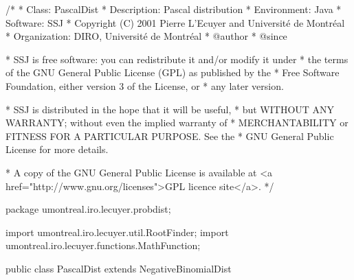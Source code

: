 \begin{code}
\begin{hide}
/*
 * Class:        PascalDist
 * Description:  Pascal distribution
 * Environment:  Java
 * Software:     SSJ 
 * Copyright (C) 2001  Pierre L'Ecuyer and Université de Montréal
 * Organization: DIRO, Université de Montréal
 * @author       
 * @since

 * SSJ is free software: you can redistribute it and/or modify it under
 * the terms of the GNU General Public License (GPL) as published by the
 * Free Software Foundation, either version 3 of the License, or
 * any later version.

 * SSJ is distributed in the hope that it will be useful,
 * but WITHOUT ANY WARRANTY; without even the implied warranty of
 * MERCHANTABILITY or FITNESS FOR A PARTICULAR PURPOSE.  See the
 * GNU General Public License for more details.

 * A copy of the GNU General Public License is available at
   <a href="http://www.gnu.org/licenses">GPL licence site</a>.
 */
\end{hide}
package umontreal.iro.lecuyer.probdist;
\begin{hide}
import umontreal.iro.lecuyer.util.RootFinder;
import umontreal.iro.lecuyer.functions.MathFunction;
\end{hide}

public class PascalDist extends NegativeBinomialDist\begin{hide} {
   private static final double EPSI = 1.0E-10;

   private static class Function implements MathFunction {
      protected int m;
      protected int max;
      protected double mean;
      protected int[] Fj;

      public Function (int m, int max, double mean, int[] Fj) {
         this.m = m;
         this.max = max;
         this.mean = mean;
         this.Fj = new int[Fj.length];
         System.arraycopy(Fj, 0, this.Fj, 0, Fj.length);
      }

      public double evaluate (double p) {
         double sum = 0.0;
         double s = (p * mean) / (1.0 - p);

         for (int j = 0; j < max; j++)
            sum += Fj[j] / (s + (double) j);

         return sum + m * Math.log (p);
      }

      public double evaluateN (int n, double p) {
         double sum = 0.0;

         for (int j = 0; j < max; j++)
            sum += Fj[j] / (n + j);

         return sum + m * Math.log (p);
      }
   }
\end{hide}
\end{code}

